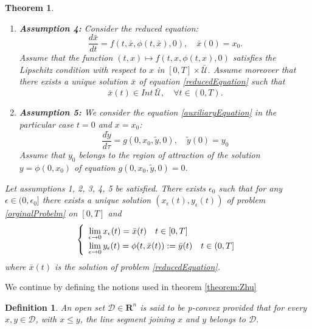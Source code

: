 \documentclass{article}
\newtheorem{theorem}{Theorem}
\newtheorem{definition}{Definition}
\begin{document}
\begin{theorem}
\begin{enumerate}
Assume that the solution $\tilde{y}_0 := \phi(t, x)$ of equation  \eqref{auxiliaryEquation} is asymptocially stable, uniformly with respect to $(t,x) \in [0, T]\times \mathcal{\bar{U}}$.

\item \textbf{Assumption 4:} 
Consider the reduced equation:
\begin{equation}\label{reducedEquation}
\dfrac{d\bar{x}}{dt} = f(t,\bar{x},\phi(t,\bar{x}), 0), \quad \bar{x}(0) = x_0.
\end{equation}
Assume that the function $(t,x) \mapsto f(t,x,\phi(t,x), 0)$ satisfies the Lipschitz condition with respect to $x$ in $[0, T]\times \mathcal{\bar{U}}$. Assume moreover that there exists a unique solution $\bar{x}$ of equation \eqref{reducedEquation} such that $$\bar{x}(t) \in Int \: \mathcal{\bar{U}}, \quad \forall t \in (0,T).$$

\item \textbf{Assumption 5:} We consider the equation \eqref{auxiliaryEquation} in the particular case $t=0$ and $x = x_0$:
\begin{equation}\label{auxiliaryEquation, 0}
\dfrac{d \tilde{y}}{d \tau} =  g(0, x_0,\tilde{y},0), \quad \tilde{y}(0) = y_0
\end{equation}
Assume that $y_0$ belongs to the region of attraction of the solution $y = \phi(0, x_0)$ of equation $g(0, x_0,\tilde{y},0) = 0$.
\end{enumerate}

Let assumptions 1, 2, 3, 4, 5 be satisfied. There exists $\epsilon_0$ such that for any $\epsilon \in (0, \epsilon_0]$ there exists a unique solution $(x_\epsilon(t), y_\epsilon(t))$ of problem \eqref{orginalProbelm} on $[0,T]$ and
\begin{equation}
\def\arraystretch{1.2}
\left\lbrace \begin{array}{l}
\lim\limits_{\epsilon \rightarrow 0}{x_\epsilon(t)} = \bar{x}(t) \quad t \in [0,T] \\
\lim\limits_{\epsilon \rightarrow 0} y_\epsilon(t) = \phi(t, \bar{x}(t)) := \bar{y}(t) \quad t \in (0,T] \\
\end{array} \right.
\end{equation}
where $\bar{x}(t)$ is the solution of problem \eqref{reducedEquation}.
\end{theorem}

We continue by defining the notions used in theorem \ref{theorem:Zhu}
\begin{definition}
An open set $\mathcal{D} \in \mathbf{R}^n$ is said to be p-convex provided that for every $x, y \in \mathcal{D}$, with $x \leq y$, the line segment joining $x$ and $y$ belongs to $\mathcal{D}$.
\end{definition}
\end{document}
